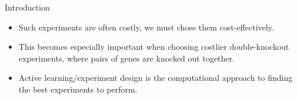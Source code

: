 \documentclass[final,handout]{beamer}
\begin{document}
\begin{frame}{}
\begin{columns}[T]
\begin{block}{Introduction\strut}
\vspace*{1ex}

\begin{itemize}
\item Such experiments are often costly, we must chose them cost-effectively.
\item This becomes especially important when choosing costlier \alert{double-knockout} experiments, where pairs of genes are knocked out together.
\item \alert{Active learning/experiment design} is the computational approach to finding the best experiments to perform.
\end{itemize}
\end{block}

%
%

\column{29em} %


\end{columns}
\end{frame}
\end{document}
